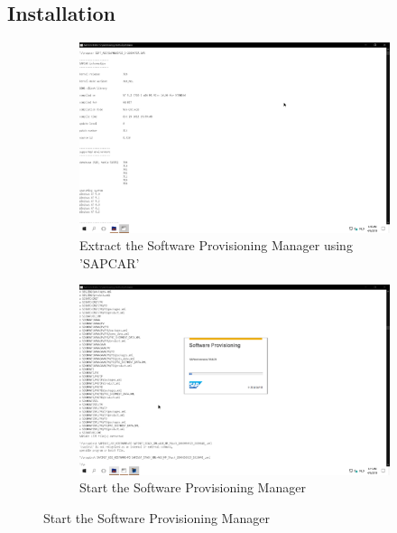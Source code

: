\subsection{Installation}
\begin{figure}[!htb]
    \begin{subfigure}{0.5\textwidth}
        \captionsetup{width=0.8\linewidth}
        \includegraphics[width=0.9\linewidth]{img/Methodologie/SAP38.png}
        \centering
        \caption{Extract the Software Provisioning Manager using 'SAPCAR'}
    \end{subfigure}
    \begin{subfigure}{0.5\textwidth}
        \captionsetup{width=0.8\linewidth}
        \includegraphics[width=0.9\linewidth]{img/Methodologie/SAP37.png} 
        \centering
        \caption{Start the Software Provisioning Manager}
    \end{subfigure}
\end{figure}
